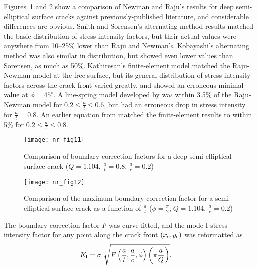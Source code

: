 Figures~\ref{fig:prior_research_1} and \ref{fig:prior_research} show a comparison of Newman and Raju's results for deep semi-elliptical surface cracks against previously-published literature, and considerable differences are obvious.
Smith and Sor\-en\-sen's alternating method results matched the basic distribution of stress intensity factors, but their actual values were anywhere from 10--25\% lower than Raju and Newman's.
Kobayashi's alternating method was also similar in distribution, but showed even lower values than Sorensen, as much as 50\%.
Kathiresan's finite-element model matched the Raju-Newman model at the free surface, but its general distribution of stress intensity factors across the crack front varied greatly, and showed an erroneous minimal value at $\phi=45^\circ$.
A line-spring model developed by \citet{ricelevy1970} was within 3.5\% of the Raju-Newman model for $0.2 \leq \frac{a}{t} \leq 0.6$, but had an erroneous drop in stress intensity for $\frac{a}{t}=0.8$.
An earlier equation from \citet{newman1973} matched the finite-element results to within 5\% for $0.2 \leq \frac{a}{t} \leq 0.8$.
\begin{figure}[tbp]
\centering
	   \texttt{[image: nr\_fig11]}
      \caption[Comparison of bound\-ary-cor\-rec\-tion factors for a deep semi-ellip\-tical surface crack ($Q=1.104$, $\frac{a}{t}=0.8$, $\frac{a}{c}=0.2$)]{Comparison of bound\-ary-cor\-rec\-tion factors for a deep semi-ellip\-tical surface crack ($Q=1.104$, $\frac{a}{t}=0.8$, $\frac{a}{c}=0.2$) \citep{rajunewman1979}}
      \label{fig:prior_research_1}
\end{figure}
\begin{figure}[tbp]
\centering
	   \texttt{[image: nr\_fig12]}
      \caption[Comparison of the maximum bound\-ary-cor\-rec\-tion factor for a semi-ellip\-tical surface crack as a function of $\frac{a}{t}$ ($\phi=\frac{\pi}{2}$, $Q=1.104$, $\frac{a}{c}=0.2$)]{Comparison of the maximum bound\-ary-cor\-rec\-tion factor for a semi-ellip\-tical surface crack as a function of $\frac{a}{t}$ ($\phi=\frac{\pi}{2}$, $Q=1.104$, $\frac{a}{c}=0.2$) \citep{rajunewman1979}}
      \label{fig:prior_research}
\end{figure}

The boundary-correction factor \(F\) was curve-fitted, and the mode I stress intensity factor \KI for any point along the crack front \((x_\textnormal{e}, y_\textnormal{e})\) was reformatted as
\begin{align}
K_\textnormal{I} &= \sigma_{\textnormal{t}} \sqrt{F\left(\frac{a}{t},\frac{a}{c},\phi\right) \left( \pi \frac{a}{Q}\right)}.
\end{align}

